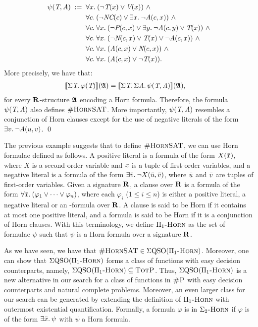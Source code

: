 \begin{exa}
\begin{align*}
\psi(\pT,\pA) \; := \;\;  & \fa{x} (\neg \pT(x) \vee \pV(x)) \ \wedge\\
& \fa{c} (\neg \textit{NC}(c) \vee \ex{x} \neg \textit{A}(c,x)) \ \wedge\\
& \fa{c} \fa{x}  (\neg \textit{P}(c,x) \vee \ex{y} \neg \textit{A}(c,y) \vee \textit{T}(x)) \ \wedge\\
& \fa{c} \fa{x} (\neg \textit{N}(c,x) \vee \textit{T}(x) \vee \neg \textit{A}(c,x)) \ \wedge \\
& \fa{c} \fa{x} (\textit{A}(c,x) \vee \textit{N}(c,x)) \ \wedge\\
& \fa{c} \fa{x} (\textit{A}(c,x) \vee \neg\textit{T}(x)).
\end{align*}
More precisely, we have that:
\begin{align*}
{\llbracket{}{\Sigma{\textit{T}}.\, \varphi(\textit{T})}\rrbracket}(\mathfrak{A}) &= {\llbracket{}{\Sigma{\textit{T}}.\, \Sigma{\textit{A}}.\, \psi(\textit{T},\textit{A})}\rrbracket}(\mathfrak{A}),
\end{align*}
 for every $\mathbf{R}$-structure $\mathfrak{A}$ encoding a Horn formula. Therefore, the formula $\psi(\textit{T},\textit{A})$ also defines $\textsc{\#HornSAT}$. More importantly, $\psi(\textit{T},\textit{A})$ resembles a conjunction of Horn clauses except for the use of negative literals of the form $\exists{v}.\: \neg \textit{A}(u,v)$. \qed
\end{exa}
The previous example suggests that to define $\textsc{\#HornSAT}$, we can use Horn formulae defined as follows. 
A positive literal is a formula of the form $X(\bar{x})$, where $X$ is a second-order variable and $\bar{x}$ is a tuple of first-order variables, and a negative literal is a formula of the form $\exists{\bar{v}}.\: \neg X(\bar{u},\bar{v})$, where $\bar{u}$ and $\bar{v}$ are tuples of first-order variables. Given a signature $\mathbf{R}$, a clause over $\mathbf{R}$ is a formula of the form $\forall{\bar{x}}.\: (\varphi_1 \vee \cdots \vee \varphi_n)$, 
where each $\varphi_i$ ($1 \leq i \leq n$) is either a positive literal, a negative literal or an \fo-formula over $\mathbf{R}$.  A clause is said to be Horn if it contains at most one positive literal, and a formula is said to be Horn if it is a conjunction of Horn clauses. With this terminology, we define $\Pi_1\textsc{-Horn}$ as the set of formulae $\psi$ such that $\psi$ is a Horn formula over a signature $\mathbf{R}$. 

As we have seen, we have that $\textsc{\#HornSAT} \in \Sigma{\rm QSO}(\Pi_1\textsc{-Horn})$. Moreover, one can show that $\Sigma{\rm QSO}(\Pi_1\textsc{-Horn})$ forms a class of functions with easy decision counterparts, namely, $\Sigma{\rm QSO}(\Pi_1\textsc{-Horn}) \subseteq \text{\sc TotP}$.
Thus, $\Sigma{\rm QSO}(\Pi_1\textsc{-Horn})$ is a new alternative in our search for a class of functions in $\text{\sc \#P}$ with easy decision counterparts and natural complete problems. Moreover, an even larger class for our search can be generated by extending the definition of $\Pi_1\textsc{-Horn}$ with outermost existential quantification. 
Formally, a formula $\varphi$ is in $\Sigma_2\textsc{-Horn}$ if $\varphi$ is of the form $\exists{\bar x}.\: \psi$ with $\psi$ a Horn formula. 

